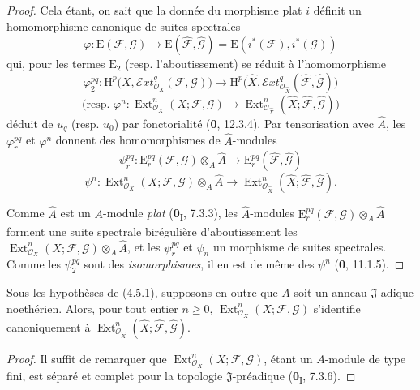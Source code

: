 \begin{proof}
Cela étant, on sait que la donnée du morphisme plat $i$ définit un
homomorphisme canonique de suites spectrales
\[
\varphi:\mathrm E(\mathcal F,\mathcal G)\longrightarrow
\mathrm E(\widehat{\mathcal F},\widehat{\mathcal G})
=\mathrm E(i^*(\mathcal F),i^*(\mathcal G))
\]
qui, pour les termes $\mathrm E_2$ (resp. l'aboutissement) se réduit à
l'homomorphisme
\[
\varphi_2^{pq}:\mathrm H^p\bigl(X,
\mathcal{E}\!xt^q_{\mathcal O_X}(\mathcal F,\mathcal G)\bigr)
\longrightarrow
\mathrm H^p\bigl(\widehat X,
\mathcal{E}\!xt^q_{\mathcal O_{\widehat X}}
(\widehat{\mathcal F},\widehat{\mathcal G})\bigr)
\]
\[
\text{(resp. }\varphi^n:\operatorname{Ext}^n_{\mathcal O_X}
(X;\mathcal F,\mathcal G)\longrightarrow
\operatorname{Ext}^n_{\mathcal O_{\widehat X}}
(\widehat X;\widehat{\mathcal F},\widehat{\mathcal G})\text{)}
\]
déduit de $u_q$ (resp. $u_0$) par fonctorialité (\textbf{0}, 12.3.4). Par
tensorisation avec $\widehat A$, les $\varphi_r^{pq}$ et $\varphi^n$ donnent
des homomorphismes de $\widehat A$-modules
\[
\psi_r^{pq}:\mathrm E_r^{pq}(\mathcal F,\mathcal G)
\otimes_A\widehat A\longrightarrow
\mathrm E_r^{pq}(\widehat{\mathcal F},\widehat{\mathcal G})
\]
\[
\psi^n:\operatorname{Ext}^n_{\mathcal O_X}(X;\mathcal F,\mathcal G)
\otimes_A\widehat A\longrightarrow
\operatorname{Ext}^n_{\mathcal O_{\widehat X}}
(\widehat X;\widehat{\mathcal F},\widehat{\mathcal G}).
\]

Comme $\widehat A$ est un $A$-module \emph{plat} (\textbf{0}\textsubscript{I}, 7.3.3), les
$\widehat A$-modules
$\mathrm E_r^{pq}(\mathcal F,\mathcal G)\otimes_A\widehat A$ forment une
suite spectrale birégulière d'aboutissement les
$\operatorname{Ext}^n_{\mathcal O_X}(X;\mathcal F,\mathcal G)\otimes_A\widehat A$, et les
$\psi_r^{pq}$ et $\psi_n$ un morphisme de suites spectrales. Comme les
$\psi_2^{pq}$ sont des \emph{isomorphismes}, il en est de même des $\psi^n$
(\textbf{0}, 11.1.5).
\end{proof}

\begin{corollary}[4.5.2]
\label{III.4.5.2-fr}
Sous les hypothèses de \textup{(\hyperref[III.4.5.1-fr]{4.5.1})}, supposons en outre
que $A$ soit un anneau $\mathfrak J$-adique noethérien. Alors, pour tout
entier $n\geq0$, $\operatorname{Ext}^n_{\mathcal O_X}(X;\mathcal F,\mathcal G)$
s'identifie canoniquement à
$\operatorname{Ext}^n_{\mathcal O_{\widehat X}}
(\widehat X;\widehat{\mathcal F},\widehat{\mathcal G})$.
\end{corollary}

\begin{proof}
Il suffit de remarquer que $\operatorname{Ext}^n_{\mathcal O_X}
(X;\mathcal F,\mathcal G)$, étant un $A$-module de type fini, est séparé et
complet pour la topologie $\mathfrak J$-préadique (\textbf{0}\textsubscript{I}, 7.3.6).
\end{proof}

